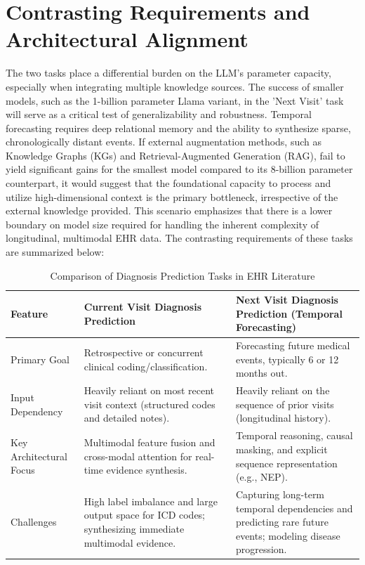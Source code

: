 \section{Contrasting Requirements and Architectural Alignment}
The two tasks place a differential burden on the LLM's parameter capacity, especially when integrating multiple knowledge sources. The success of smaller models, such as the 1-billion parameter Llama variant, in the 'Next Visit' task will serve as a critical test of generalizability and robustness. Temporal forecasting requires deep relational memory and the ability to synthesize sparse, chronologically distant events. If external augmentation methods, such as Knowledge Graphs (KGs) and Retrieval-Augmented Generation (RAG), fail to yield significant gains for the smallest model compared to its 8-billion parameter counterpart, it would suggest that the foundational capacity to process and utilize high-dimensional context is the primary bottleneck, irrespective of the external knowledge provided. This scenario emphasizes that there is a lower boundary on model size required for handling the inherent complexity of longitudinal, multimodal EHR data.
The contrasting requirements of these tasks are summarized below:
\begin{table}[htbp]
\centering
\caption{Comparison of Diagnosis Prediction Tasks in EHR Literature}
\label{tab:task_comparison}
\begin{tabularx}{0.98\textwidth}{>{\raggedright\arraybackslash}p{2.7cm} 
                                  >{\raggedright\arraybackslash}X 
                                  >{\raggedright\arraybackslash}X}
\toprule
\textbf{Feature} & \textbf{Current Visit Diagnosis Prediction} & \textbf{Next Visit Diagnosis Prediction (Temporal Forecasting)} \\
\midrule
Primary Goal & Retrospective or concurrent clinical coding/classification. & Forecasting future medical events, typically 6 or 12 months out.\cite{ref3} \\
Input Dependency & Heavily reliant on most recent visit context (structured codes and detailed notes).\cite{ref11} & Heavily reliant on the sequence of prior visits (longitudinal history).\cite{ref1} \\
Key Architectural Focus & Multimodal feature fusion and cross-modal attention for real-time evidence synthesis.\cite{ref4} & Temporal reasoning, causal masking, and explicit sequence representation (e.g., NEP).\cite{ref5} \\
Challenges & High label imbalance and large output space for ICD codes; synthesizing immediate multimodal evidence. & Capturing long-term temporal dependencies and predicting rare future events; modeling disease progression.\cite{ref3} \\
\bottomrule
\end{tabularx}
\end{table}

